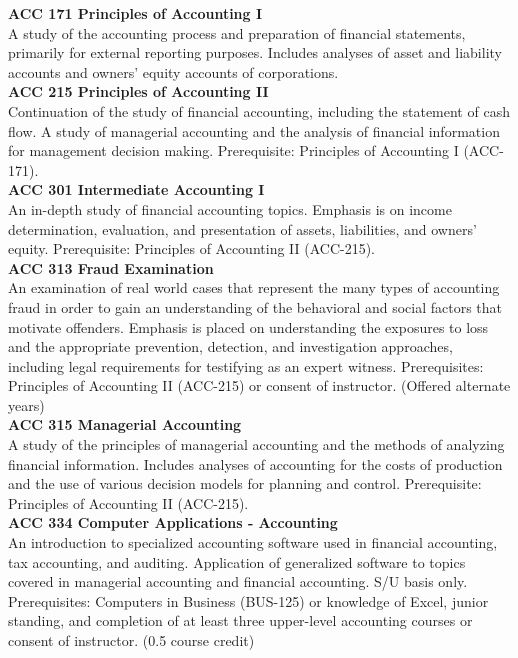\documentclass[
  letterpaper,
]{scrbook}
\begin{document}
\textbf{ACC 171 Principles of Accounting I}\\
A study of the accounting process and preparation of financial
statements, primarily for external reporting purposes. Includes analyses
of asset and liability accounts and owners' equity accounts of
corporations.\\
\textbf{ACC 215 Principles of Accounting II}\\
Continuation of the study of financial accounting, including the
statement of cash flow. A study of managerial accounting and the
analysis of financial information for management decision making.
Prerequisite: Principles of Accounting I (ACC-171).\\
\textbf{ACC 301 Intermediate Accounting I}\\
An in-depth study of financial accounting topics. Emphasis is on income
determination, evaluation, and presentation of assets, liabilities, and
owners' equity. Prerequisite: Principles of Accounting II (ACC-215).\\
\textbf{ACC 313 Fraud Examination}\\
An examination of real world cases that represent the many types of
accounting fraud in order to gain an understanding of the behavioral and
social factors that motivate offenders. Emphasis is placed on
understanding the exposures to loss and the appropriate prevention,
detection, and investigation approaches, including legal requirements
for testifying as an expert witness. Prerequisites: Principles of
Accounting II (ACC-215) or consent of instructor. (Offered alternate
years)\\
\textbf{ACC 315 Managerial Accounting}\\
A study of the principles of managerial accounting and the methods of
analyzing financial information. Includes analyses of accounting for the
costs of production and the use of various decision models for planning
and control. Prerequisite: Principles of Accounting II (ACC-215).\\
\textbf{ACC 334 Computer Applications - Accounting}\\
An introduction to specialized accounting software used in financial
accounting, tax accounting, and auditing. Application of generalized
software to topics covered in managerial accounting and financial
accounting. S/U basis only. Prerequisites: Computers in Business
(BUS-125) or knowledge of Excel, junior standing, and completion of at
least three upper-level accounting courses or consent of instructor.
(0.5 course credit)\\
\end{document}
